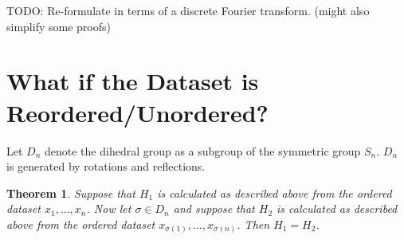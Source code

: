 \documentclass[reqno]{amsart}
\newtheorem{thm}{Theorem}
\begin{document}
TODO: Re-formulate in terms of a discrete Fourier transform. (might also simplify some proofs)

\section{What if the Dataset is Reordered/Unordered?}

Let $D_n$ denote the dihedral group as a subgroup of the symmetric group $S_n$.
$D_n$ is generated by rotations and reflections.
\begin{thm}\label{dihedral-invariance}
    Suppose that $H_1$ is calculated as described above from the ordered dataset $x_1, \dots, x_n$. 
    Now let $\sigma \in D_n$ and suppose that $H_2$ is calculated as described above from the ordered dataset $x_{\sigma(1)}, \dots, x_{\sigma(n)}$.
    Then $H_1=H_2$.
\end{thm}
\end{document}
